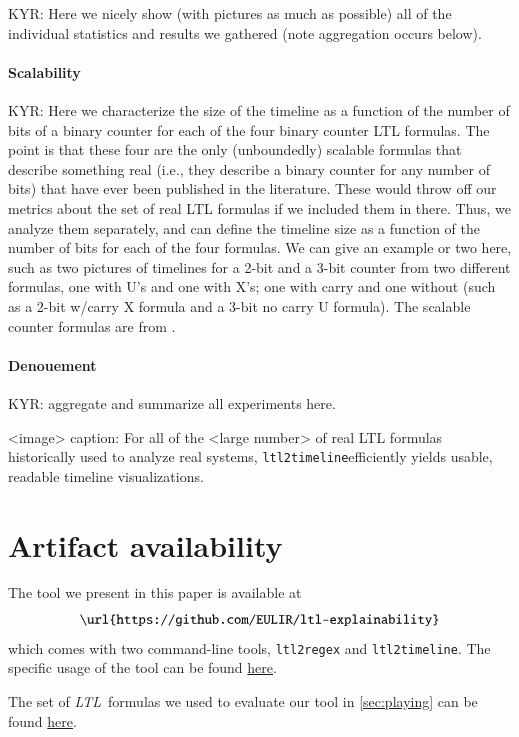 \documentclass[preprint,12pt]{elsarticle}
\theoremstyle{definition}
\theoremstyle{remark}
\newcommand{\ltl}{\textit{LTL}}
\newcommand{\tool}{\hspace{0.1cm}\texttt{ltl2timeline}\hspace{0.1cm}}
\begin{document}
KYR: Here we nicely show (with pictures as much as possible) all of the individual statistics and results we gathered (note aggregation occurs below).


\paragraph{Scalability}
KYR: Here we characterize the size of the timeline as a function of the number of bits of a binary counter for each of the four binary counter LTL formulas. The point is that these four are the only (unboundedly) scalable formulas that describe something real (i.e., they describe a binary counter for any number of bits) that have ever been published in the literature. These would throw off our metrics about the set of real LTL formulas if we included them in there. Thus, we analyze them separately, and can define the timeline size as a function of the number of bits for each of the four formulas. We can give an example or two here, such as two pictures of timelines for a 2-bit and a 3-bit counter from two different formulas, one with U's and one with X's; one with carry and one without (such as a 2-bit w/carry X formula and a 3-bit no carry U formula). The scalable counter formulas are from \cite{RV10}.


\paragraph{Denouement}
KYR: aggregate and summarize all experiments here.

<image>
caption: For all of the <large number> of real LTL formulas historically used to analyze real systems, \tool efficiently yields usable, readable timeline visualizations.



\section{Artifact availability}
The tool we present in this paper is available at
\[
    \texttt{\url{https://github.com/EULIR/ltl-explainability}}
\]
which comes with two command-line tools, \texttt{ltl2regex} and \texttt{ltl2timeline}. The specific usage of the tool can be found  \href{https://github.com/EULIR/ltl-explainability#usage}{here}.

The set of \ltl\ formulas we used to evaluate our tool in \cref{sec:playing} can be found \href{https://github.com/EULIR/ltl-explainability/tree/main/ltl-formulas}{here}.
\end{document}
